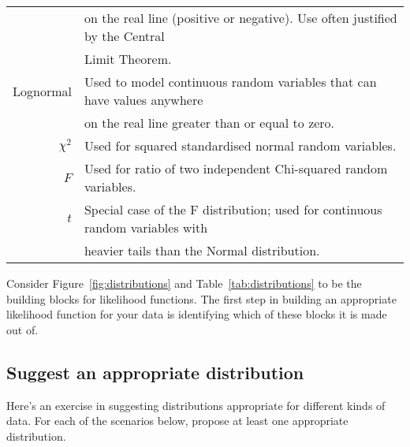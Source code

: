 \begin{table}[ht]
\begin{center}
\begin{tabular}{rl}
       & on the real line (positive or negative). Use often justified by the Central \\
       & Limit Theorem.
\\
Lognormal & Used to model continuous random variables that can have values anywhere \\
       & on the real line greater than or equal to zero.
\\
$\chi^2$ & Used for squared standardised normal random variables.
\\
$F$ & Used for ratio of two independent Chi-squared random variables.
\\
$t$ & Special case of the F distribution; used for continuous random variables with \\
  & heavier tails than the Normal distribution.
\\
\hline
\end{tabular}
\end{center}
\label{default}
\end{table}

\clearpage

Consider Figure~\ref{fig:distributions} and Table~\ref{tab:distributions} to be the building blocks for likelihood functions. The first step in building an appropriate likelihood function for your data is identifying which of these blocks it is made out of.

\subsection{Suggest an appropriate distribution}

Here's an exercise in suggesting distributions appropriate for different kinds of data. For each of the scenarios below, propose at least one appropriate distribution.

